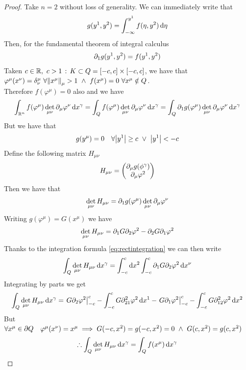 \documentclass[../complete.tex]{subfiles}
\begin{document}
\begin{proof}
	Take $n=2$ without loss of generality. We can immediately write that
	\begin{equation*}
		g(y^1,y^2)=\int_{-\infty}^{y^1}f(\eta,y^2)\operatorname{d\!}\eta
	\end{equation*}
	Then, for the fundamental theorem of integral calculus
	\begin{equation*}
		\partial_1g(y^1,y^2)=f(y^1,y^2)
	\end{equation*}
	Taken $c\in\mathbb{R},\ c>1\, :\,  K\subset Q=[-c,c]\times[-c,c]$, we have that $\varphi^\mu(x^\nu)=\delta^\mu_\nu\ \forall\norm{x^\mu}_\mu>1\ \wedge\ f(x^\mu)=0\ \forall x^\mu\notin Q$.\\
	Therefore $f(\varphi^\mu)=0$ also and we have
	\begin{equation*}
		\int_{\mathbb{R}^n}^{}f(\varphi^\mu)\det_{\mu\nu}\partial_\mu\varphi^\nu\operatorname{d\!} x^\gamma=\int_{Q}^{}f(\varphi^\mu)\det_{\mu\nu}\partial_\mu\varphi^\nu\operatorname{d\!} x^\gamma=\int_{Q}^{}\partial_1g(\varphi^\mu)\det_{\mu\nu}\partial_\mu\varphi^\nu\operatorname{d\!} x^\gamma
	\end{equation*}
	But we have that
	\begin{equation*}
		g(y^\mu)=0\quad\forall\abs{y^1}\ge c\ \vee\ \abs{y^1}<-c
	\end{equation*}
	Define the following matrix $H_{\mu\nu}$
	\begin{equation*}
		H_{\mu\nu}=\begin{pmatrix}\partial_\mu g(\phi^\gamma)\\\partial_\mu\varphi^2\end{pmatrix}
	\end{equation*}
	Then we have that
	\begin{equation*}
		\det_{\mu\nu}H_{\mu\nu}=\partial_1g(\varphi^\mu)\det_{\mu\nu}\partial_{\mu}\varphi^\nu
	\end{equation*}
	Writing $g(\varphi^\mu)=G(x^\mu)$ we have
	\begin{equation*}
		\det_{\mu\nu}H_{\mu\nu}=\partial_1G\partial_2\varphi^2-\partial_2G\partial_1\varphi^2
	\end{equation*}
	Thanks to the integration formula \eqref{eq:rectintegration} we can then write
	\begin{equation*}
		\int_{Q}^{}\det_{\mu\nu}H_{\mu\nu}\operatorname{d\!} x^\gamma=\int_{-c}^{c}\operatorname{d\!} x^2\int_{-c}^{c}\partial_1G\partial_2\varphi^2\operatorname{d\!} x^\nu
	\end{equation*}
	Integrating by parts we get
	\begin{equation*}
		\int_{Q}^{}\det_{\mu\nu}H_{\mu\nu}\operatorname{d\!} x^\gamma=\left.G\partial_2\varphi^2\right|^c_{-c}-\int_{-c}^{c}G\partial_{21}^2\varphi^2\operatorname{d\!} x^1-\left.G\partial_1\varphi^2\right|^c_{-c}-\int_{-c}^{c}G\partial_{12}^2\varphi^2\operatorname{d\!} x^2
	\end{equation*}
	But $\forall x^\mu\in\del Q\quad\varphi^\mu(x^\nu)=x^\mu\implies{} G(-c,x^2)=g(-c,x^2)=0\ \wedge\ G(c,x^2)=g(c,x^2)$
	\begin{equation*}
		\therefore\int_{Q}^{}\det_{\mu\nu}H_{\mu\nu}\operatorname{d\!} x^\gamma=\int_{Q}^{}f(x^\mu)\operatorname{d\!} x^\gamma
	\end{equation*}
\end{proof}
\end{document}
